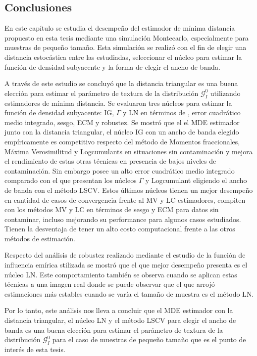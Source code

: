 \subsection{Conclusiones}

En este capítulo se estudia el desempeño del estimador de mínima distancia propuesto en esta tesis mediante una simulación Montecarlo, especialmente para muestras de pequeño tamaño. Esta simulación se realizó con el fin de elegir una distancia estocástica entre las estudiadas, seleccionar el núcleo para estimar la función de densidad subyacente y la forma de elegir el ancho de banda.

A través de este estudio se concluyó que la distancia triangular es una buena elección para estimar el parámetro de textura de la distribución $\mathcal{G}_I^0$ utilizando estimadores de mínima distancia. Se evaluaron tres núcleos para estimar la función de densidad subyacente: IG, $\Gamma$ y LN en términos de , error cuadrático medio integrado, sesgo, ECM y robustez. Se mostró que el el MDE estimador junto con la distancia triangular, el núcleo IG con un ancho de banda elegido empíricamente es competitivo respecto del método de Momentos fraccionales, Máxima Verosimilitud y Logcumulants en situaciones sin contaminación y mejora el rendimiento de estas otras técnicas en presencia de bajos niveles de contaminación. Sin embargo posee un alto error cuadrático medio integrado comparado con el que presentan los núcleos $\Gamma$ y Logcumulant eligiendo el ancho de banda con el método LSCV. Estos últimos núcleos tienen un mejor desempeño en cantidad de casos de convergencia frente al MV y LC estimadores, compiten con los métodos MV y LC en términos de sesgo y ECM para datos sin contaminar, incluso mejorando su performance para algunos casos estudiados. Tienen la desventaja de tener un alto costo computacional frente a las otros métodos de estimación.

Respecto del análisis de robustez realizado mediante el estudio de la función de influencia emírica stilizada se mostró que el que mejor desempeño presenta es el núcleo LN. Este comportamiento también se observa cuando se aplican estas técnicas a una imagen real donde se puede observar que el que arrojó estimaciones más estables cuando se varía el tamaño de muestra es el método LN.

 Por lo tanto, este análisis nos lleva a concluir que el MDE estimador con la distancia triangular, el núcleo LN y el método LSCV para elegir el ancho de banda es una buena elección para estimar el parámetro de textura de la distribución $\mathcal{G}_I^0$ para el caso de muestras de pequeño tamaño que es el punto de interés de esta tesis.
